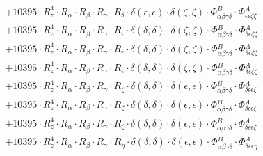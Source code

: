 \documentclass{article}
\begin{document}
\begin{subequations}
\begin{gather}
\begin{array}{c}
 \\[0.2em] 		 + 10395 \cdot R_{z}^{4} \cdot R_{\alpha{}} \cdot R_{\beta{}} \cdot R_{\gamma{}} \cdot R_{\delta{}} \cdot \delta{}\left(\epsilon{}, \epsilon{}\right) \cdot \delta{}\left(\zeta{}, \zeta{}\right) \cdot \Phi{}^{B}_{\alpha{}\beta{}\gamma{}\delta{}} \cdot \Phi{}^{A}_{\epsilon{}\epsilon{}\zeta{}\zeta{}} 
 \\[0.2em] 		 + 10395 \cdot R_{z}^{4} \cdot R_{\alpha{}} \cdot R_{\beta{}} \cdot R_{\gamma{}} \cdot R_{\epsilon{}} \cdot \delta{}\left(\delta{}, \delta{}\right) \cdot \delta{}\left(\zeta{}, \zeta{}\right) \cdot \Phi{}^{B}_{\alpha{}\beta{}\gamma{}\delta{}} \cdot \Phi{}^{A}_{\delta{}\epsilon{}\zeta{}\zeta{}} 
 \\[0.2em] 		 + 10395 \cdot R_{z}^{4} \cdot R_{\alpha{}} \cdot R_{\beta{}} \cdot R_{\gamma{}} \cdot R_{\epsilon{}} \cdot \delta{}\left(\delta{}, \delta{}\right) \cdot \delta{}\left(\zeta{}, \zeta{}\right) \cdot \Phi{}^{B}_{\alpha{}\beta{}\gamma{}\delta{}} \cdot \Phi{}^{A}_{\delta{}\epsilon{}\zeta{}\zeta{}} 
 \\[0.2em] 		 + 10395 \cdot R_{z}^{4} \cdot R_{\alpha{}} \cdot R_{\beta{}} \cdot R_{\gamma{}} \cdot R_{\epsilon{}} \cdot \delta{}\left(\delta{}, \delta{}\right) \cdot \delta{}\left(\zeta{}, \zeta{}\right) \cdot \Phi{}^{B}_{\alpha{}\beta{}\gamma{}\delta{}} \cdot \Phi{}^{A}_{\delta{}\epsilon{}\zeta{}\zeta{}} 
 \\[0.2em] 		 + 10395 \cdot R_{z}^{4} \cdot R_{\alpha{}} \cdot R_{\beta{}} \cdot R_{\gamma{}} \cdot R_{\zeta{}} \cdot \delta{}\left(\delta{}, \delta{}\right) \cdot \delta{}\left(\epsilon{}, \epsilon{}\right) \cdot \Phi{}^{B}_{\alpha{}\beta{}\gamma{}\delta{}} \cdot \Phi{}^{A}_{\delta{}\epsilon{}\epsilon{}\zeta{}} 
 \\[0.2em] 		 + 10395 \cdot R_{z}^{4} \cdot R_{\alpha{}} \cdot R_{\beta{}} \cdot R_{\gamma{}} \cdot R_{\zeta{}} \cdot \delta{}\left(\delta{}, \delta{}\right) \cdot \delta{}\left(\epsilon{}, \epsilon{}\right) \cdot \Phi{}^{B}_{\alpha{}\beta{}\gamma{}\delta{}} \cdot \Phi{}^{A}_{\delta{}\epsilon{}\epsilon{}\zeta{}} 
 \\[0.2em] 		 + 10395 \cdot R_{z}^{4} \cdot R_{\alpha{}} \cdot R_{\beta{}} \cdot R_{\gamma{}} \cdot R_{\zeta{}} \cdot \delta{}\left(\delta{}, \delta{}\right) \cdot \delta{}\left(\epsilon{}, \epsilon{}\right) \cdot \Phi{}^{B}_{\alpha{}\beta{}\gamma{}\delta{}} \cdot \Phi{}^{A}_{\delta{}\epsilon{}\epsilon{}\zeta{}} 
 \\[0.2em] 		 + 10395 \cdot R_{z}^{4} \cdot R_{\alpha{}} \cdot R_{\beta{}} \cdot R_{\gamma{}} \cdot R_{\eta{}} \cdot \delta{}\left(\delta{}, \delta{}\right) \cdot \delta{}\left(\epsilon{}, \epsilon{}\right) \cdot \Phi{}^{B}_{\alpha{}\beta{}\gamma{}\delta{}} \cdot \Phi{}^{A}_{\delta{}\epsilon{}\epsilon{}\eta{}} 

\end{array}
\end{gather}
\end{subequations}
\end{document}
